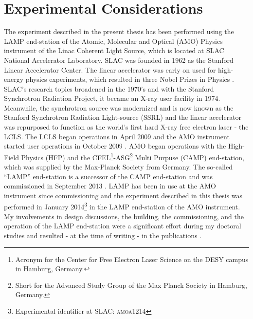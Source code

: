 \chapter{Experimental Considerations}\label{ch:exp_setup}
The experiment described in the present thesis has been performed using the LAMP end-station of the Atomic, Molecular and Optical (AMO) Physics instrument of the Linac Coherent Light Source, which is located at SLAC National Accelerator Laboratory. SLAC was founded in 1962 as the Stanford Linear Accelerator Center. The linear accelerator was early on used for high-energy physics experiments, which resulted in three Nobel Prizes in Physics \citep{Richter-1976-NP,Taylor-NP-1990,Perl-NP-1995}. SLAC's research topics broadened in the 1970's and with the Stanford Synchrotron Radiation Project, it became an X-ray user facility in 1974. Meanwhile, the synchrotron source was modernized and is now known as the Stanford Synchrotron Radiation Light-source (SSRL) and the linear accelerator was repurposed to function as the world's first hard X-ray free electron laser - the LCLS. The LCLS began operations in April 2009 \citep{Emma-2010-NatPho} and the AMO instrument started user operations in October 2009 \citep{Bostedt-2013-JPB}. AMO began operations with the High-Field Physics (HFP) and the CFEL\footnote{Acronym for the Center for Free Electron Laser Science on the DESY campus in Hamburg, Germany.}-ASG\footnote{Short for the Advanced Study Group of the Max Planck Society in Hamburg, Germany.} Multi Purpuse (CAMP) end-station, which was supplied by the Max-Planck Society from Germany. The so-called ``LAMP'' end-station is a successor of the CAMP end-station and was commissioned in September 2013 \cite{Ferguson-2015-JSR}. LAMP has been in use at the AMO instrument since commissioning and the experiment described in this thesis was performed in January 2014\footnote{Experimental identifier at SLAC: \textsc{amoa1214}} in the LAMP end-station of the AMO instrument. My involvements in design discussions, the building, the commissioning, and the operation of the LAMP end-station were a significant effort during my doctoral studies and resulted - at the time of writing - in the publications \cite{Picon-2016-NatComm,Munke-2016-naturedata,Kimberg-2016-FD,Sanchez-Gonzalez-2015-JphysB,Lehmann-2016-PRA,MacDonald-2016-RSI,Gamboa-2016-JI,Bernado-2017-PRB,Ferguson-2015-JSR}.\\[1\baselineskip]
